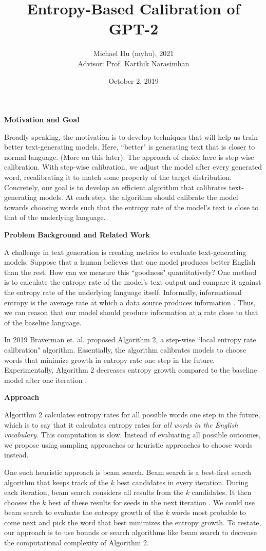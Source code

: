 \documentclass[12pt]{extarticle}
\title{Entropy-Based Calibration of GPT-2}
\author{Michael Hu (myhu), 2021 \\ 
Advisor: Prof. Karthik Narasimhan}
\date{October 2, 2019}
\begin{document}
\maketitle

{\large \textbf{Motivation and Goal}}

Broadly speaking, the motivation is to develop techniques that will help us train better text-generating models. Here, ``better" is generating text that is closer to normal language. (More on this later). The approach of choice here is step-wise calibration. With step-wise calibration, we adjust the model after every generated word, recalibrating it to match some property of the target distribution. Concretely, our goal is to develop an efficient algorithm that calibrates text-generating models. At each step, the algorithm should calibrate the model towards choosing words such that the entropy rate of the model's text is close to that of the underlying language.

{\large \textbf{Problem Background and Related Work}}

A challenge in text generation is creating metrics to evaluate text-generating models. Suppose that a human believes that one model produces better English than the rest. How can we measure this ``goodness" quantitatively? One method is to calculate the entropy rate of the model's text output and compare it against the entropy rate of the underlying language itself. Informally, informational entropy is the average rate at which a data source produces information \cite{shannon-ie}. Thus, we can reason that our model should produce information at a rate close to that of the baseline language.

In 2019 Braverman et. al. proposed Algorithm 2, a step-wise ``local entropy rate calibration" algorithm. Essentially, the algorithm calibrates models to choose words that minimize growth in entropy rate one step in the future. Experimentally, Algorithm 2 decreases entropy growth compared to the baseline model after one iteration \cite{Braverman}. 

{\large \textbf{Approach}}

Algorithm 2 calculates entropy rates for all possible words one step in the future, which is to say that it calculates entropy rates for \textit{all words in the English vocabulary}. This computation is slow. Instead of evaluating all possible outcomes, we propose using sampling approaches or heuristic approaches to choose words instead. 

One such heuristic approach is beam search. Beam search is a best-first search algorithm that keeps track of the $k$ best candidates in every iteration. During each iteration, beam search considers all results from the $k$ candidates. It then chooses the $k$ best of these results for seeds in the next iteration \cite{beam-search}. We could use beam search to evaluate the entropy growth of the $k$ words most probable to come next and pick the word that best minimizes the entropy growth. To restate, our approach is to use bounds or search algorithms like beam search to decrease the computational complexity of Algorithm 2.
\end{document}
